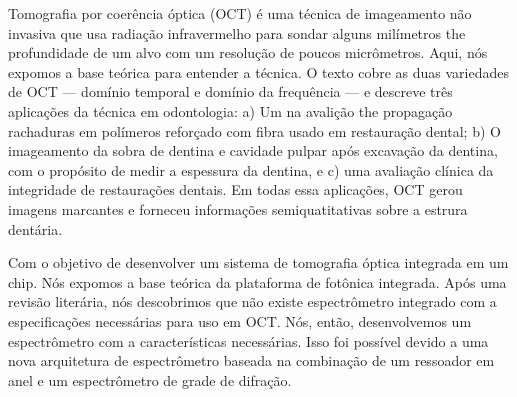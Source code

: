 Tomografia por coerência óptica (OCT) é uma técnica de imageamento não invasiva que usa radiação infravermelho para sondar alguns milímetros the profundidade de um alvo com um resolução de poucos micrômetros. Aqui, nós expomos a base teórica para entender a técnica. O texto cobre as duas variedades de OCT --- domínio temporal e domínio da frequência --- e descreve três aplicações da técnica em odontologia: a) Um na avalição the propagação rachaduras em polímeros reforçado com fibra usado em restauração dental; b) O imageamento da sobra de dentina e cavidade pulpar após excavação da dentina, com o propósito de medir a espessura da dentina, e c) uma avaliação clínica da integridade de restaurações dentais. Em todas essa aplicações, OCT gerou imagens marcantes e forneceu informações semiquatitativas sobre a estrura dentária.

Com o objetivo de desenvolver um sistema de tomografia óptica integrada em um chip. Nós expomos a base teórica da plataforma de fotônica integrada. Após uma revisão literária, nós descobrimos que não existe espectrômetro integrado com a especificações necessárias para uso em OCT. Nós, então, desenvolvemos um espectrômetro com a características necessárias. Isso foi possível devido a uma nova arquitetura de espectrômetro baseada na combinação de um ressoador em anel e um espectrômetro de grade de difração.
